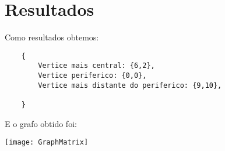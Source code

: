 \documentclass[a4paper, 12pt]{article}
\begin{document}
\newpage
\section{Resultados}
\graphicspath{ {./Results/} }
Como resultados obtemos:

\begin{verbatim}
    {
        Vertice mais central: {6,2},
        Vertice periferico: {0,0},
        Vertice mais distante do periferico: {9,10},

    }
\end{verbatim}

E o grafo obtido foi:

\texttt{[image: GraphMatrix]}
\end{document}
